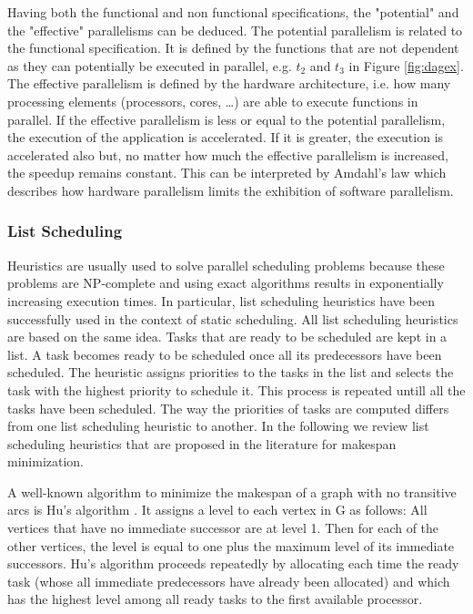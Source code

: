 Having both the functional and non functional specifications, the "potential" and the "effective" parallelisms can be deduced. The potential parallelism is related to the functional specification. It is defined by the functions that are not dependent as they can potentially be executed in parallel, e.g. $t_2$ and $t_3$ in Figure \ref{fig:dagex}. The effective parallelism is defined by the hardware architecture, i.e. how many processing elements (processors, cores, \ldots) are able to execute functions in parallel. If the effective parallelism is less or equal to the potential parallelism, the execution of the application is accelerated. If it is greater, the execution is accelerated also but, no matter how much the effective parallelism is increased, the speedup remains constant. This can be interpreted by Amdahl's law which describes how hardware parallelism limits the exhibition of software parallelism.


\subsubsection{List Scheduling}

Heuristics are usually used to solve parallel scheduling problems because these problems are NP-complete \cite{garey:2002} and using exact algorithms results in exponentially increasing execution times. In particular, list scheduling heuristics have been successfully used in the context of static scheduling. All list scheduling heuristics are based on the same idea. Tasks that are ready to be scheduled are kept in a list. A task becomes ready to be scheduled once all its predecessors have been scheduled. The heuristic assigns priorities to the tasks in the list and selects the task with the highest priority to schedule it. This process is repeated untill all the tasks have been scheduled. The way the priorities of tasks are computed differs from one list scheduling heuristic to another. In the following we review list scheduling heuristics that are proposed in the literature for makespan minimization.

A well-known algorithm to minimize the makespan of a graph with no transitive arcs is Hu's algorithm \cite{hu:1961}. It assigns a level to each vertex in G as follows: All vertices that have no immediate successor are at level 1. Then for each of the other vertices, the level is equal to one plus the maximum level of its immediate successors. Hu's algorithm proceeds repeatedly by allocating each time the ready task (whose all immediate predecessors have already been allocated) and which has the highest level among all ready tasks to the first available processor. 

